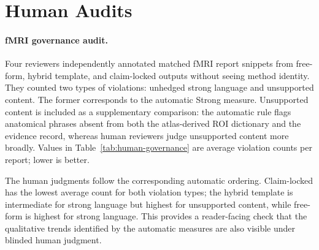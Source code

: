 \documentclass[10pt,twocolumn]{article}
\begin{document}
\section{Human Audits}
\label{app:human-audits}

\paragraph{fMRI governance audit.} Four reviewers independently annotated matched fMRI report snippets from free-form, hybrid template, and claim-locked outputs without seeing method identity. They counted two types of violations: unhedged strong language and unsupported content. The former corresponds to the automatic Strong measure. Unsupported content is included as a supplementary comparison: the automatic rule flags anatomical phrases absent from both the atlas-derived ROI dictionary and the evidence record, whereas human reviewers judge unsupported content more broadly. Values in Table~\ref{tab:human-governance} are average violation counts per report; lower is better.

The human judgments follow the corresponding automatic ordering. Claim-locked has the lowest average count for both violation types; the hybrid template is intermediate for strong language but highest for unsupported content, while free-form is highest for strong language. This provides a reader-facing check that the qualitative trends identified by the automatic measures are also visible under blinded human judgment.
\end{document}

